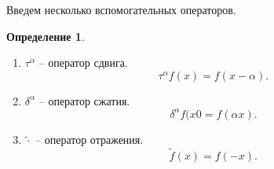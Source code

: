 \documentclass[a5paper, 10pt]{article}
\theoremstyle{definition}
\newtheorem{Def}{Определение}
\theoremstyle{plain}
\theoremstyle{remark}
\begin{document}
    Введем несколько вспомогательных операторов.
    \begin{Def}
        \begin{enumerate}
            \item $\tau^\alpha$ -- оператор сдвига. 
                \[
                \tau^\alpha f (x) = f(x-\alpha).
                \] 
            \item $\delta^\alpha$ -- оператор сжатия.
                \[
                \delta^\alpha f(x0 = f(\alpha x).
                \] 
            \item $\tilde{\cdot}$ -- оператор отражения.
                 \[
                     \tilde{f}(x) = f(-x).
                \] 
        \end{enumerate}
    \end{Def}
\end{document}
